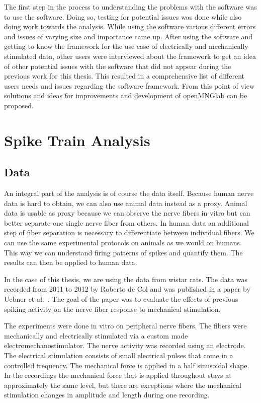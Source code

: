 The first step in the process to understanding the problems with the software was to use the software. Doing so, testing for potential issues was done while also doing work towards the analysis.
While using the software various different errors and issues of varying size and importance came up.
After using the software and getting to know the framework for the use case of electrically and mechanically stimulated data,  other users were interviewed about the framework to get an idea of other potential issues with the software that did not appear during the previous work for this thesis.
This resulted in a comprehensive list of different users needs and issues regarding the software framework. From this point of view solutions and ideas for improvements and development of openMNGlab can be proposed.


\section{Spike Train Analysis}

\subsection{Data}
An integral part of the analysis is of course the data itself. Because human nerve data is hard to obtain, we can also use animal data instead as a proxy. Animal data is usable as proxy because we can observe the nerve fibers in vitro but can better separate one single nerve fiber from others. In human data an additional step of fiber separation is necessary to differentiate between individual fibers. We can use the same experimental protocols on animals as we would on humans. This way we can understand firing patterns of spikes and quantify them. The results can then be applied to human data.

In the case of this thesis, we are using the data from wistar rats. The data was recorded from 2011 to 2012 by Roberto de Col and was published in a paper by Uebner et al.~\cite{roberto}. The goal of the paper was to evaluate the effects of previous spiking activity on the nerve fiber response to mechanical stimulation.

The experiments were done in vitro on peripheral nerve fibers. The fibers were mechanically and electrically stimulated via a custom made electromechanostimulator. The nerve activity was recorded using an electrode. The electrical stimulation consists of small electrical pulses that come in a controlled frequency. The mechanical force is applied in a half sinusoidal shape. In the recordings the mechanical force that is applied throughout stays at approximately the same level, but there are exceptions where the mechanical stimulation changes in amplitude and length during one recording. 

